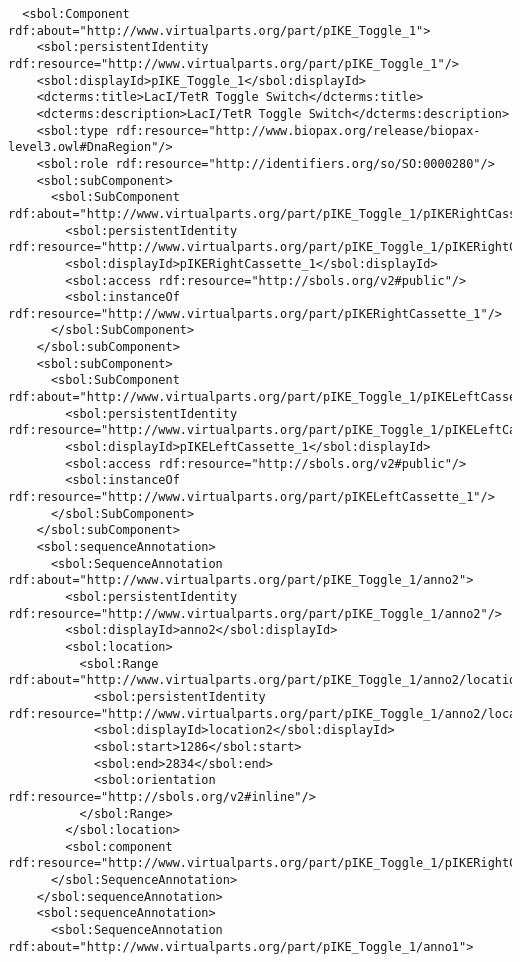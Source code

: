 \begin{lstlisting}
  <sbol:Component rdf:about="http://www.virtualparts.org/part/pIKE_Toggle_1">
    <sbol:persistentIdentity rdf:resource="http://www.virtualparts.org/part/pIKE_Toggle_1"/>
    <sbol:displayId>pIKE_Toggle_1</sbol:displayId>
    <dcterms:title>LacI/TetR Toggle Switch</dcterms:title>
    <dcterms:description>LacI/TetR Toggle Switch</dcterms:description>
    <sbol:type rdf:resource="http://www.biopax.org/release/biopax-level3.owl#DnaRegion"/>
    <sbol:role rdf:resource="http://identifiers.org/so/SO:0000280"/>
    <sbol:subComponent>
      <sbol:SubComponent rdf:about="http://www.virtualparts.org/part/pIKE_Toggle_1/pIKERightCassette_1">
        <sbol:persistentIdentity rdf:resource="http://www.virtualparts.org/part/pIKE_Toggle_1/pIKERightCassette_1"/>
        <sbol:displayId>pIKERightCassette_1</sbol:displayId>
        <sbol:access rdf:resource="http://sbols.org/v2#public"/>
        <sbol:instanceOf rdf:resource="http://www.virtualparts.org/part/pIKERightCassette_1"/>
      </sbol:SubComponent>
    </sbol:subComponent>
    <sbol:subComponent>
      <sbol:SubComponent rdf:about="http://www.virtualparts.org/part/pIKE_Toggle_1/pIKELeftCassette_1">
        <sbol:persistentIdentity rdf:resource="http://www.virtualparts.org/part/pIKE_Toggle_1/pIKELeftCassette_1"/>
        <sbol:displayId>pIKELeftCassette_1</sbol:displayId>
        <sbol:access rdf:resource="http://sbols.org/v2#public"/>
        <sbol:instanceOf rdf:resource="http://www.virtualparts.org/part/pIKELeftCassette_1"/>
      </sbol:SubComponent>
    </sbol:subComponent>
    <sbol:sequenceAnnotation>
      <sbol:SequenceAnnotation rdf:about="http://www.virtualparts.org/part/pIKE_Toggle_1/anno2">
        <sbol:persistentIdentity rdf:resource="http://www.virtualparts.org/part/pIKE_Toggle_1/anno2"/>
        <sbol:displayId>anno2</sbol:displayId>
        <sbol:location>
          <sbol:Range rdf:about="http://www.virtualparts.org/part/pIKE_Toggle_1/anno2/location2">
            <sbol:persistentIdentity rdf:resource="http://www.virtualparts.org/part/pIKE_Toggle_1/anno2/location2"/>
            <sbol:displayId>location2</sbol:displayId>
            <sbol:start>1286</sbol:start>
            <sbol:end>2834</sbol:end>
            <sbol:orientation rdf:resource="http://sbols.org/v2#inline"/>
          </sbol:Range>
        </sbol:location>
        <sbol:component rdf:resource="http://www.virtualparts.org/part/pIKE_Toggle_1/pIKERightCassette_1"/>
      </sbol:SequenceAnnotation>
    </sbol:sequenceAnnotation>
    <sbol:sequenceAnnotation>
      <sbol:SequenceAnnotation rdf:about="http://www.virtualparts.org/part/pIKE_Toggle_1/anno1">

\end{lstlisting}
